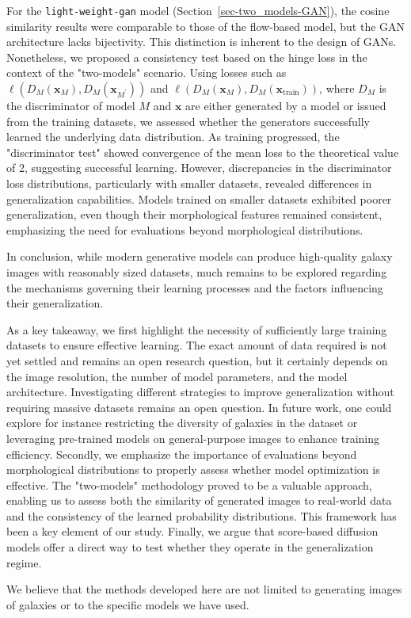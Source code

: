 \documentclass[fleqn,usenatbib]{mnras}
\begin{document}
For the \texttt{light-weight-gan} model (Section~\ref{sec-two_models-GAN}), the cosine similarity results were comparable to those of the flow-based model, but the GAN architecture lacks bijectivity. This distinction is inherent to the design of GANs. Nonetheless, we proposed a consistency test based on the hinge loss in the context of the "two-models" scenario. Using losses such as \(\ell(D_M(\bm{x}_M), D_M(\bm{x}_{M^\prime}))\) and \(\ell(D_M(\bm{x}_M), D_M(\bm{x}_{\text{train}}))\), where \(D_M\) is the discriminator of model \(M\) and $\bm{x}$ are either generated by a model or issued from the training datasets, we assessed whether the generators successfully learned the underlying data distribution. As training progressed, the "discriminator test" showed convergence of the mean loss to the theoretical value of 2, suggesting successful learning. However, discrepancies in the discriminator loss distributions, particularly with smaller datasets, revealed differences in generalization capabilities. Models trained on smaller datasets exhibited poorer generalization, even though their morphological features remained consistent, emphasizing the need for evaluations beyond morphological distributions.


In conclusion, while modern generative models can produce high-quality galaxy images with reasonably sized datasets, much remains to be explored regarding the mechanisms governing their learning processes and the factors influencing their generalization.  
{\color{red}
As a key takeaway, we first highlight the necessity of sufficiently large training datasets to ensure effective learning. The exact amount of data required is not yet settled and remains an open research question, but it certainly depends on the image resolution, the number of model parameters, and the model architecture. Investigating different strategies to improve generalization without requiring massive datasets remains an open question. In future work, one could explore for instance restricting the diversity of galaxies in the dataset or leveraging pre-trained models on general-purpose images to enhance training efficiency.  
Secondly, we emphasize the importance of evaluations beyond morphological distributions to properly assess whether model optimization is effective. The "two-models" methodology proved to be a valuable approach, enabling us to assess both the similarity of generated images to real-world data and the consistency of the learned probability distributions. This framework has been a key element of our study.  
Finally, we argue that score-based diffusion models offer a direct way to test whether they operate in the generalization regime.  

We believe that the methods developed here are not limited to generating images of galaxies or to the specific models we have used.  
}  
\end{document}
